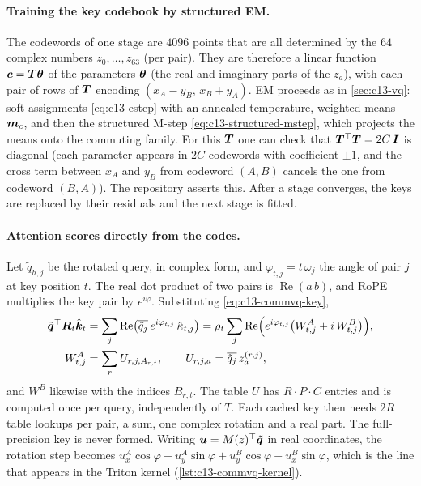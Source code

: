\paragraph{Training the key codebook by structured EM.} The codewords of one stage are
$4096$ points that are all determined by the $64$ complex numbers $z_0,\dots,z_{63}$ (per pair). They are
therefore a linear function $\bm{c}=\bm{T}\bm{\theta}$ of the parameters $\bm{\theta}$ (the real and imaginary
parts of the $z_a$), with each pair of rows of $\bm{T}$ encoding $(x_A-y_B,\,x_B+y_A)$. EM proceeds as in
\cref{sec:c13-vq}: soft assignments \eqref{eq:c13-estep} with an annealed temperature, weighted means
$\bm{m}_c$, and then the structured M-step \eqref{eq:c13-structured-mstep}, which projects the means onto the
commuting family. For this $\bm{T}$ one can check that $\bm{T}^{\top}\bm{T}=2C\,\bm{I}$ is diagonal (each parameter appears in
$2C$ codewords with coefficient $\pm1$, and the cross term between $x_A$ and $y_B$ from codeword $(A,B)$
cancels the one from codeword $(B,A)$). The repository asserts this.
After a stage converges, the keys are replaced by their residuals and the next stage is fitted.

\paragraph{Attention scores directly from the codes.} Let $\tilde{q}_{h,j}$ be the rotated query, in
complex form, and $\varphi_{t,j}=t\,\omega_j$ the angle of pair $j$ at key position $t$. The real dot
product of two pairs is $\operatorname{Re}(\bar a\,b)$, and RoPE multiplies the key pair by
$e^{i\varphi}$. Substituting \eqref{eq:c13-commvq-key},
\begin{equation}\label{eq:c13-commvq-score}
\begin{aligned}
  \tilde{\bm{q}}^{\top}\bm{R}_t\hat{\bm{k}}_t
  &= \sum_j\operatorname{Re}\bigl(\overline{\tilde q_j}\,e^{i\varphi_{t,j}}\,\hat\kappa_{t,j}\bigr)
   = \rho_t\sum_j\operatorname{Re}\Bigl(e^{i\varphi_{t,j}}\bigl(W^{A}_{t,j}+i\,W^{B}_{t,j}\bigr)\Bigr),\\
  W^{A}_{t,j}&=\sum_r U_{r,j,A_{r,t}},\qquad U_{r,j,a}=\overline{\tilde q_j}\,z^{(r,j)}_a ,
\end{aligned}
\end{equation}
and $W^B$ likewise with the indices $B_{r,t}$. The table $U$ has $R\cdot P\cdot C$ entries and is
computed once per query, independently of $T$. Each cached key then needs $2R$ table lookups per pair,
a sum, one complex rotation and a real part. The full-precision key is never formed. Writing
$\bm{u}=M(z)^{\top}\tilde{\bm{q}}$ in real coordinates, the rotation step becomes
$u^A_x\cos\varphi+u^A_y\sin\varphi+u^B_y\cos\varphi-u^B_x\sin\varphi$, which is the line that appears
in the Triton kernel (\cref{lst:c13-commvq-kernel}).

